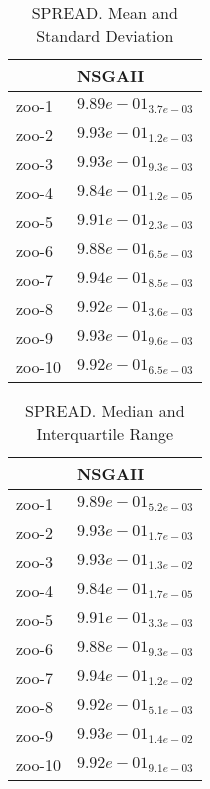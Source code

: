 \documentclass{article}
\begin{document}
\begin{table}
\caption{SPREAD. Mean and Standard Deviation}
\label{table: SPREAD}
\centering
\begin{scriptsize}
\begin{tabular}{ll}
\hline &  NSGAII\\
\hline 
zoo-1 & \cellcolor{gray95}$  9.89e-01_{ 3.7e-03}$ \\
zoo-2 & \cellcolor{gray95}$  9.93e-01_{ 1.2e-03}$ \\
zoo-3 & \cellcolor{gray95}$  9.93e-01_{ 9.3e-03}$ \\
zoo-4 & \cellcolor{gray95}$  9.84e-01_{ 1.2e-05}$ \\
zoo-5 & \cellcolor{gray95}$  9.91e-01_{ 2.3e-03}$ \\
zoo-6 & \cellcolor{gray95}$  9.88e-01_{ 6.5e-03}$ \\
zoo-7 & \cellcolor{gray95}$  9.94e-01_{ 8.5e-03}$ \\
zoo-8 & \cellcolor{gray95}$  9.92e-01_{ 3.6e-03}$ \\
zoo-9 & \cellcolor{gray95}$  9.93e-01_{ 9.6e-03}$ \\
zoo-10 & \cellcolor{gray95}$  9.92e-01_{ 6.5e-03}$ \\
\hline
\end{tabular}
\end{scriptsize}
\end{table}

\begin{table}
\caption{SPREAD. Median and Interquartile Range}
\label{table: SPREAD}
\centering
\begin{scriptsize}
\begin{tabular}{ll}
\hline &  NSGAII\\
\hline 
zoo-1 & \cellcolor{gray95}$  9.89e-01_{ 5.2e-03}$ \\
zoo-2 & \cellcolor{gray95}$  9.93e-01_{ 1.7e-03}$ \\
zoo-3 & \cellcolor{gray95}$  9.93e-01_{ 1.3e-02}$ \\
zoo-4 & \cellcolor{gray95}$  9.84e-01_{ 1.7e-05}$ \\
zoo-5 & \cellcolor{gray95}$  9.91e-01_{ 3.3e-03}$ \\
zoo-6 & \cellcolor{gray95}$  9.88e-01_{ 9.3e-03}$ \\
zoo-7 & \cellcolor{gray95}$  9.94e-01_{ 1.2e-02}$ \\
zoo-8 & \cellcolor{gray95}$  9.92e-01_{ 5.1e-03}$ \\
zoo-9 & \cellcolor{gray95}$  9.93e-01_{ 1.4e-02}$ \\
zoo-10 & \cellcolor{gray95}$  9.92e-01_{ 9.1e-03}$ \\
\hline
\end{tabular}
\end{scriptsize}
\end{table}
\end{document}
